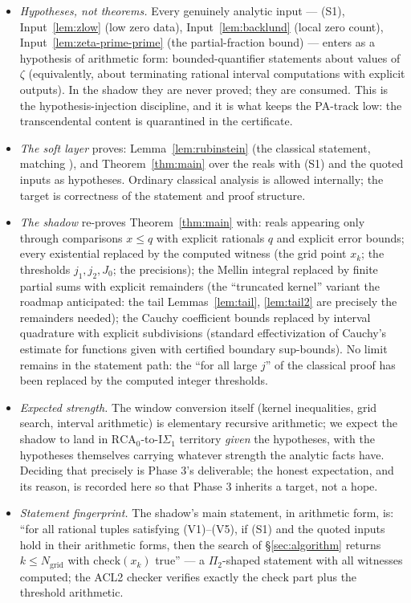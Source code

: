 \documentclass[11pt]{amsart}
\numberwithin{equation}{section}
\begin{document}
\begin{itemize}
\item \emph{Hypotheses, not theorems.} Every genuinely analytic input
--- (S1), Input~\ref{lem:zlow} (low zero data),
Input~\ref{lem:backlund} (local zero count),
Input~\ref{lem:zeta-prime-prime} (the partial-fraction bound) --- enters
as a hypothesis of arithmetic form: bounded-quantifier statements about
values of $\zeta$ (equivalently, about terminating rational interval
computations with explicit outputs). In the shadow they are never
proved; they are consumed. This is the hypothesis-injection discipline,
and it is what keeps the PA-track low: the transcendental content is
quarantined in the certificate.
\item \emph{The soft layer} proves: Lemma~\ref{lem:rubinstein} (the
classical statement, matching \cite{Rub26}), and
Theorem~\ref{thm:main} over the reals with (S1) and the quoted inputs
as hypotheses. Ordinary classical analysis is allowed internally; the
target is correctness of the statement and proof structure.
\item \emph{The shadow} re-proves Theorem~\ref{thm:main} with: reals
appearing only through comparisons $x \le q$ with explicit rationals
$q$ and explicit error bounds; every existential replaced by the
computed witness (the grid point $x_k$; the thresholds $j_1, j_2,
J_0$; the precisions); the Mellin integral replaced by finite partial
sums with explicit remainders (the ``truncated kernel'' variant the
roadmap anticipated: the tail Lemmas~\ref{lem:tail}, \ref{lem:tail2}
are precisely the remainders needed); the Cauchy coefficient bounds
replaced by interval quadrature with explicit subdivisions (standard
effectivization of Cauchy's estimate for functions given with
certified boundary sup-bounds). No limit remains in the statement
path: the ``for all large $j$'' of the classical proof has been
replaced by the computed integer thresholds.
\item \emph{Expected strength.} The window conversion itself (kernel
inequalities, grid search, interval arithmetic) is elementary
recursive arithmetic; we expect the shadow to land in
$\mathrm{RCA}_0$-to-$\mathrm{I}\Sigma_1$ territory \emph{given} the
hypotheses, with the hypotheses themselves carrying whatever strength
the analytic facts have. Deciding that precisely is Phase 3's
deliverable; the honest expectation, and its reason, is recorded here
so that Phase 3 inherits a target, not a hope.
\item \emph{Statement fingerprint.} The shadow's main statement, in
arithmetic form, is:
``for all rational tuples satisfying (V1)--(V5), if (S1) and the
quoted inputs hold in their arithmetic forms, then the search of
\S\ref{sec:algorithm} returns $k \le N_{\mathrm{grid}}$ with
$\mathrm{check}(x_k)$ true'' --- a $\Pi_2$-shaped statement with all
witnesses computed; the ACL2 checker verifies exactly the
$\mathrm{check}$ part plus the threshold arithmetic.
\end{itemize}
\end{document}
